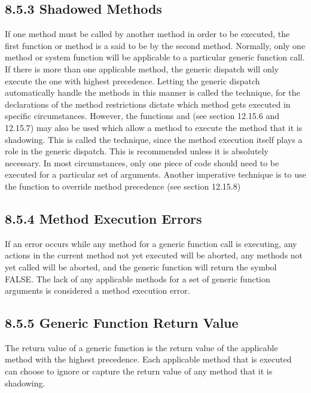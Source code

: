 \documentclass[letterpaper,10pt,english]{sphinxmanual}
\begin{document}
\subsection{8.5.3 Shadowed Methods}
\label{\detokenize{generic:shadowed-methods}}
If one method must be called by another method in order to be executed,
the first function or method is a said to be  by the second
method. Normally, only one method or system function will be applicable
to a particular generic function call. If there is more than one
applicable method, the generic dispatch will only execute the one with
highest precedence. Letting the generic dispatch automatically handle
the methods in this manner is called the  technique, for
the declarations of the method restrictions dictate which method gets
executed in specific circumstances. However, the functions
 and  (see section 12.15.6
and 12.15.7) may also be used which allow a method to execute the method
that it is shadowing. This is called the  technique, since
the method execution itself plays a role in the generic dispatch. This
is  recommended unless it is absolutely necessary. In most
circumstances, only one piece of code should need to be executed for a
particular set of arguments. Another imperative technique is to use the
function  to override method precedence (see
section 12.15.8)


\subsection{8.5.4 Method Execution Errors}
\label{\detokenize{generic:method-execution-errors}}
If an error occurs while any method for a generic function call is
executing, any actions in the current method not yet executed will be
aborted, any methods not yet called will be aborted, and the generic
function will return the symbol FALSE. The lack of any applicable
methods for a set of generic function arguments is considered a method
execution error.


\subsection{8.5.5 Generic Function Return Value}
\label{\detokenize{generic:generic-function-return-value}}
The return value of a generic function is the return value of the
applicable method with the highest precedence. Each applicable method
that is executed can choose to ignore or capture the return value of any
method that it is shadowing.
\end{document}
